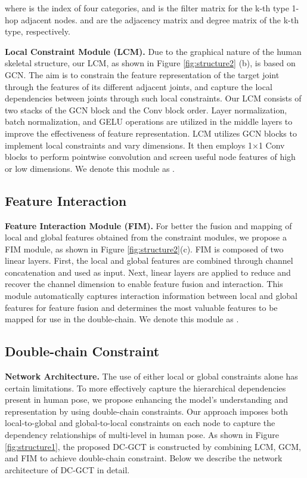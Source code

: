 \documentclass[journal]{IEEEtran}
\begin{document}
where  is the index of four categories, and  is the filter matrix for the k-th type 1-hop adjacent nodes.  and  are the adjacency matrix and degree matrix of the k-th type, respectively.







{\bf{Local Constraint Module (LCM).}} Due to the graphical nature of the human skeletal structure, our LCM, as shown in Figure \ref{fig:structure2} (b), is based on GCN. The aim is to constrain the feature representation of the target joint through the features of its different adjacent joints, and capture the local dependencies between joints through such local constraints. Our LCM consists of two stacks of the GCN block and the Conv block order. Layer normalization, batch normalization, and GELU operations are utilized in the middle layers to improve the effectiveness of feature representation. LCM utilizes GCN blocks to implement local constraints and vary dimensions. It then employs 1×1 Conv blocks to perform pointwise convolution and screen useful node features of high or low dimensions. We denote this module as .


\subsection{Feature Interaction}


{\bf{Feature Interaction Module (FIM).}} For better the fusion and mapping of local and global features obtained from the constraint modules, we propose a FIM module, as shown in Figure \ref{fig:structure2}(c). FIM is composed of two linear layers. First, the local and global features are combined through channel concatenation and used as input. Next, linear layers are applied to reduce and recover the channel dimension to enable feature fusion and interaction. This module automatically captures interaction information between local and global features for feature fusion and determines the most valuable features to be mapped for use in the double-chain. We denote this module as .




\subsection{Double-chain Constraint}





{\bf{Network Architecture.}} The use of either local or global constraints alone has certain limitations. To more effectively capture the hierarchical dependencies present in human pose, we propose enhancing the model's understanding and representation by using double-chain constraints. Our approach imposes both local-to-global and global-to-local constraints on each node to capture the dependency relationships of multi-level in human pose. As shown in Figure \ref{fig:structure1}, the proposed DC-GCT is constructed by combining LCM, GCM, and FIM to achieve double-chain constraint. Below we describe the network architecture of DC-GCT in detail.
\end{document}
